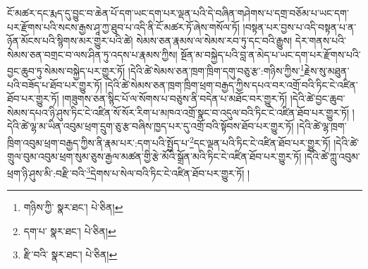 ངོ་མཚར་དང་རྨད་དུ་བྱུང་བ་ཆེན་པོ་དག་ཡང་དག་པར་ལྡན་པའི་དེ་བཞིན་གཤེགས་པ་དགྲ་བཅོམ་པ་ཡང་དག་པར་རྫོགས་པའི་སངས་རྒྱས་ཤཱ་ཀྱ་ཐུབ་པ་འདི་ནི་ངོ་མཚར་ཏོ་ཞེས་གསོལ་ཏོ། །བསྟན་པར་བྱས་པ་འདི་བསྟན་པ་ན་ཉོན་མོངས་པའི་སྙིགས་མར་གྱུར་པའི་ཚེ། སེམས་ཅན་རྣམས་ལ་སེམས་རབ་ཏུ་དང་བའི་རྒྱུས། དེར་གནས་པའི་སེམས་ཅན་བགྲང་བ་ལས་ཤིན་ཏུ་འདས་པ་རྣམས་ཀྱིས། སྔོན་མ་བསྐྱེད་པའི་བླ་ན་མེད་པ་ཡང་དག་པར་རྫོགས་པའི་བྱང་ཆུབ་ཏུ་སེམས་བསྐྱེད་པར་གྱུར་ཏོ། །དེའི་ཚེ་སེམས་ཅན་ཁྲག་ཁྲིག་དགུ་བཅུ་རྩ་:གཉིས་ཀྱིས་\footnote{གཉིས་ཀྱི་  སྣར་ཐང་།  པེ་ཅིན། }རྗེས་སུ་མཐུན་པའི་བཟོད་པ་ཐོབ་པར་གྱུར་ཏོ། །དེའི་ཚེ་སེམས་ཅན་ཁྲག་ཁྲིག་ཕྲག་བརྒྱད་ཀྱིས་དཔའ་བར་འགྲོ་བའི་ཏིང་ངེ་འཛིན་ཐོབ་པར་གྱུར་ཏོ། །གཟུགས་ཅན་སྙིང་པོ་ལ་སོགས་པ་བཅུས་ནི་བདེན་པ་མཐོང་བར་གྱུར་ཏོ། །དེའི་ཚེ་བྱང་ཆུབ་སེམས་དཔའ་ཉི་ཤུས་ཏིང་ངེ་འཛིན་སོ་སོར་རིག་པ་མཁའ་འགྲོ་སྣང་བ་འདུལ་བའི་ཏིང་ངེ་འཛིན་ཐོབ་པར་གྱུར་ཏོ། །དེའི་ཚེ་ལྷ་མ་ཡིན་འབུམ་ཕྲག་དྲུག་ཅུ་རྩ་བཞིས་ཁྱད་པར་དུ་འགྲོ་བའི་སྟོབས་ཐོབ་པར་གྱུར་ཏོ། །དེའི་ཚེ་ལྷ་ཁྲག་ཁྲིག་འབུམ་ཕྲག་བརྒྱད་ཀྱིས་ནི་རྣམ་པར་:དག་པའི་སྤྱོད་པ་\footnote{དག་པ་  སྣར་ཐང་།  པེ་ཅིན། }དང་ལྡན་པའི་ཏིང་ངེ་འཛིན་ཐོབ་པར་གྱུར་ཏོ། །དེའི་ཚེ་གྲུལ་བུམ་འབུམ་ཕྲག་སུམ་ཅུས་རྒྱལ་མཚན་གྱི་རྩེ་མོའི་སྒྲོན་མའི་ཏིང་ངེ་འཛིན་ཐོབ་པར་གྱུར་ཏོ། །དེའི་ཚེ་ཀླུ་འབུམ་ཕྲག་ཉི་ཤུས་མི་:བརྫི་བའི་\footnote{རྫི་བའི་  སྣར་ཐང་།  པེ་ཅིན། }དྲེགས་པ་སེལ་བའི་ཏིང་ངེ་འཛིན་ཐོབ་པར་གྱུར་ཏོ། །
